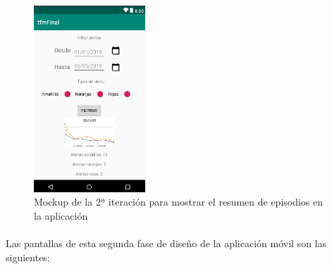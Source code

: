 \begin{figure}[H]
    \centering
    \begin{minipage}{.45\textwidth}
        \centering
        \includegraphics[width=0.8\linewidth, height=7cm]{Imagenes/04DescProblema/mockups/v2/android/05-resumenEpisodios.png}
        \caption[Mockup de la 2ª iteración para mostrar el resumen de episodios en la aplicación]{Mockup de la 2ª iteración para mostrar el resumen de episodios en la aplicación}
        \label{c4:fig:v2:android:episodios}
    \end{minipage}
\end{figure}

\paragraph{}
Las pantallas de esta segunda fase de diseño de la aplicación móvil son las siguientes:

